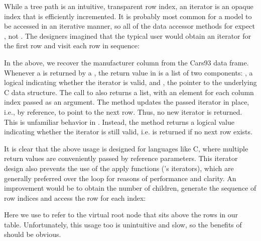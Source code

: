 While a tree path is an intuitive, transparent row index, an iterator
is an opaque index that is efficiently incremented. It is
probably most common for a model to be accessed in an iterative
manner, so all of the data accessor methods for 
expect , not . The \GTK\/
designers imagined that the typical user would obtain an iterator for
the first row and visit each row in sequence:
\begin{Schunk}
\end{Schunk}
%
In the above, we recover the manufacturer column from the Cars93 data
frame. Whenever a  is returned by a
, the return value in \R\/ is a list of two
components: , a logical indicating whether the iterator
is valid, and , the pointer to the underlying C data
structure. The call to  also returns a list,
with an element for each column index passed as an argument. The
method  updates the passed iterator in
place, i.e., by reference, to point to the next row. Thus, no new
iterator is returned. This is unfamiliar behavior in \R. Instead, the
method returns a logical value indicating whether the iterator is
still valid, i.e.  is returned if no next row exists.

It is clear that the above usage is designed for languages like C,
where multiple return values are conveniently passed by reference
parameters. This iterator design also prevents the use of the apply
functions (\R's iterators), which are generally preferred over the  loop
for reasons of performance and clarity. An improvement would be to
obtain the number of children, generate the sequence of row indices
and access the row for each index:
\begin{Schunk}
\end{Schunk}
%
Here we use  to refer to the virtual root node that sits
above the rows in our table. Unfortunately, this usage too is
unintuitive and slow, so the benefits of  should
be obvious.

